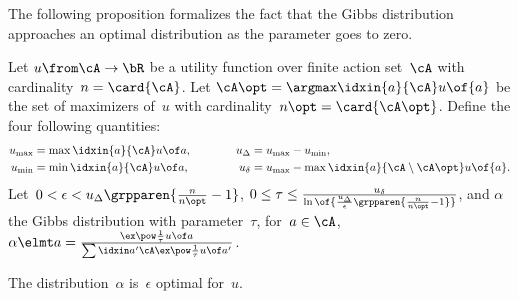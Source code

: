 The following proposition formalizes the fact that the Gibbs distribution approaches an optimal distribution as the parameter goes to zero.

\newcommand{\umax}{u_{\mathrm{max}}}
\newcommand{\umin}{u_{\mathrm{min}}}
\newcommand{\uDelta}{u_{\Delta}}
\newcommand{\udelta}{u_{\delta}}
\newcommand{\gibbsua}{\gibbs{\tau}{u \of}{}{a}{a'}{\cA}}
\newcommand{\uopt}{u_{\mathrm{opt}}}
\newcommand{\urest}{u_{\mathrm{rest}}}
\newcommand{\unmn}{\uDelta\grpparen{\frac{n}{n\opt} - 1}}
\newcommand{\unmne}{\frac{\uDelta}{\epsilon}\grpparen{\frac{n}{n\opt} - 1}}

\begin{proposition}
\label{res:approximate_optimality_gibbs_distribution}
Let \(u \from \cA \to \bR\) be a utility function over finite action set~\(\cA\) with cardinality~\(n = \card{\cA}\).
Let \(\cA\opt = \argmax\idxin{a}{\cA} u \of {a}\) be the set of maximizers of~\(u\) with cardinality~\(n\opt = \card{\cA\opt}\).
Define the four following quantities:
\[
\begin{split}
\begin{aligned}
\umax &= \max\idxin{a}{\cA} u \of a, \\
\umin &= \min\idxin{a}{\cA} u \of a,
\end{aligned}
\end{split}
\qquad\qquad
\begin{split}
\begin{aligned}
\uDelta &= \umax - \umin, \\
\udelta &= \umax - \max\idxin{a}{\cA \setminus \cA\opt} u\of{a}.
\end{aligned}
\end{split}
\]
Let~\(0 < \epsilon < \unmn\), \(0 \le \tau \le \frac{\udelta}{\ln \of{\unmne}}\), and \(\alpha\) the Gibbs distribution with parameter~\(\tau\), \ie for~\(a \in \cA\), \(\alpha \elmt a = \gibbsua\).

The distribution~\(\alpha\) is~\(\epsilon\) optimal for~\(u\).
\end{proposition}

